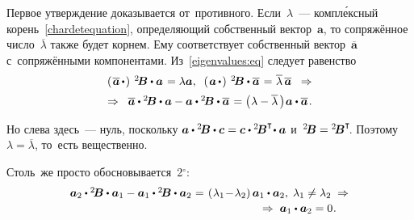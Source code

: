 \begin{otherlanguage}{russian}
Первое утверждение доказывается от~противного. Если~$\lambda$~--- компл\'{е}ксный корень~\eqref{chardetequation}, определяющий собственный вектор~$\bm{a}$, то сопряжённое число~$\overline{\lambda}$ также будет корнем. Ему соответствует собственный вектор~$\overline{\bm{a}}$ с~сопряжёнными компонентами. Из~\eqref{eigenvalues:eq} следует равенство
\[\begin{array}{c}
\left(\hspace{0.2ex}{\overline{\bm{a}} \, \dotp}\hspace{0.2ex}\right) \hspace{0.5ex} {^2\!\bm{B}} \dotp \bm{a} \hspace{0.2ex} = \lambda \bm{a}, \;\;
\left(\hspace{0.2ex}{\bm{a} \, \dotp}\hspace{0.2ex}\right) \hspace{0.5ex} {^2\!\bm{B}} \dotp \overline{\bm{a}} \hspace{0.2ex} = \hspace{0.1ex} \overline{\lambda} \, \overline{\bm{a}}
\;\;\Rightarrow \\[0.5em]
\Rightarrow\;\; \overline{\bm{a}} \dotp {^2\!\bm{B}} \dotp \bm{a} - \bm{a} \dotp {^2\!\bm{B}} \dotp \overline{\bm{a}} \hspace{0.2ex} = \left(\hspace{0.1ex}{\lambda - \overline{\lambda}}\hspace{0.16em}\right)\hspace{-0.1em} \bm{a} \dotp \overline{\bm{a}} \hspace{0.2ex}.
\end{array}\]
\vspace{-0.4em}

\noindent Но слева здесь~--- нуль, поскольку ${\bm{a} \dotp {^2\!\bm{B}} \dotp \bm{c} = \bm{c} \dotp {^2\!\bm{B}^{\T}\!} \dotp \bm{a}}$ и~${{^2\!\bm{B}} = {^2\!\bm{B}^{\T}\!}}$. Поэтому ${\lambda = \overline{\lambda}}$, то~есть вещественно.

Столь~же просто обосновывается~2$^{\circ}$:
\vspace{0.2em}\[\begin{array}{c}
\tikzmark{BeginEqualsZeroBrace} {\bm{a}_2 \dotp {^2\!\bm{B}} \dotp \bm{a}_1 - \bm{a}_1 \dotp {^2\!\bm{B}} \dotp \bm{a}_2} \hspace{0.1ex} \tikzmark{EndEqualsZeroBrace} = \hspace{0.2ex} \left(\hspace{0.1ex}{\lambda_1 \!-\! \lambda_2}\right) \bm{a}_1 \dotp \bm{a}_2, \; \lambda_1 \neq \lambda_2 \;\Rightarrow \\[0.2em]
\hspace{16em} \Rightarrow\; \bm{a}_1 \dotp \bm{a}_2 = 0 \hspace{0.1ex}.
\end{array}\]


\end{otherlanguage}
